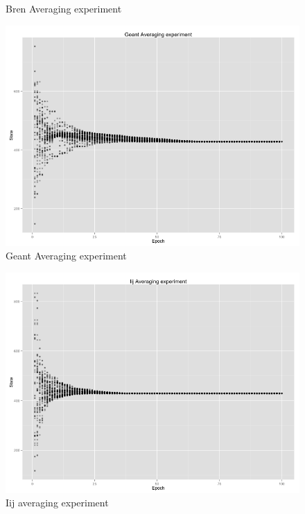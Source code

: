 \begin{figure}[h!]
\begin{minipage}[t]{0.47\textwidth}
    Bren Averaging experiment
    \end{minipage}
    \vspace{5ex}
    \begin{minipage}[t]{0.47\textwidth}
    \vspace{0pt}
    \includegraphics[width=\linewidth]{figures/Geant.png}
    Geant Averaging experiment
    \end{minipage}
    \begin{minipage}[t]{0.47\textwidth}
    \vspace{0pt}
    \includegraphics[width=\linewidth]{figures/Iij.png}
    Iij averaging experiment
    \end{minipage}
    \caption{}
    \label{fig: result}
\end{figure}


